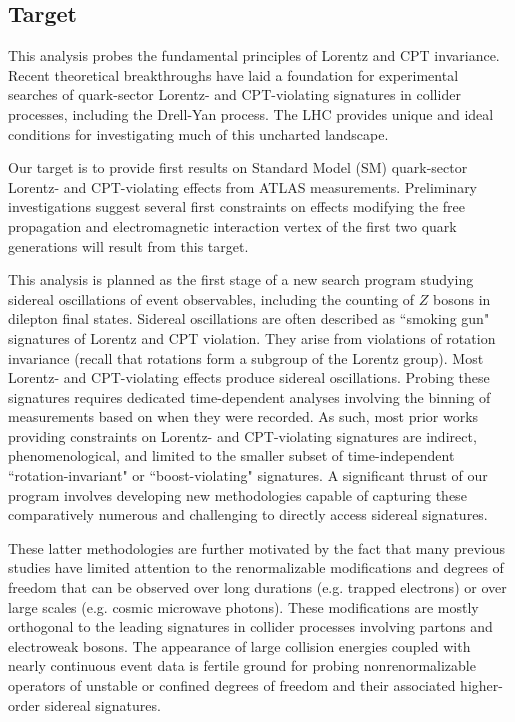 \subsection{Target}
This analysis probes the fundamental principles 
of Lorentz and CPT invariance. 
Recent theoretical breakthroughs have 
laid a foundation for experimental searches of 
quark-sector Lorentz- and CPT-violating
signatures in collider processes, including
the Drell-Yan process. The LHC provides unique
and ideal conditions for investigating 
much of this uncharted landscape.

Our target is to provide first results on Standard Model (SM)
quark-sector Lorentz- and CPT-violating effects from ATLAS 
measurements. Preliminary investigations 
suggest several first constraints on 
effects modifying the free propagation and
electromagnetic interaction vertex of the first
two quark generations will result from this target.

This analysis is planned as 
the first stage of a new search program 
studying sidereal oscillations of event observables, 
including the counting of $Z$ bosons 
in dilepton final states. Sidereal oscillations
are often described as ``smoking gun" signatures
of Lorentz and CPT violation. They arise from
violations of rotation invariance (recall 
that rotations form a subgroup of the Lorentz group). 
Most Lorentz- and CPT-violating effects produce sidereal oscillations.
Probing these signatures requires dedicated time-dependent
analyses involving the binning of measurements based on
when they were recorded.
As such, most prior works providing constraints
on Lorentz- and CPT-violating signatures
are indirect, phenomenological, and limited
to the smaller subset of time-independent
``rotation-invariant"
or ``boost-violating" signatures. 
A significant thrust of our program 
involves developing new methodologies
capable of capturing these 
comparatively numerous and challenging 
to directly access sidereal signatures. 

These latter methodologies are further motivated
by the fact that many previous studies 
have limited attention
to the renormalizable modifications and 
degrees of freedom that can be observed over long
durations (e.g. trapped electrons) 
or over large scales (e.g. cosmic microwave photons).
These modifications are mostly orthogonal 
to the leading signatures in collider processes
involving partons and electroweak bosons. 
The appearance of large collision energies coupled with 
nearly continuous event data is fertile 
ground for probing nonrenormalizable operators
of unstable or confined degrees of freedom 
and their associated higher-order sidereal signatures. 

